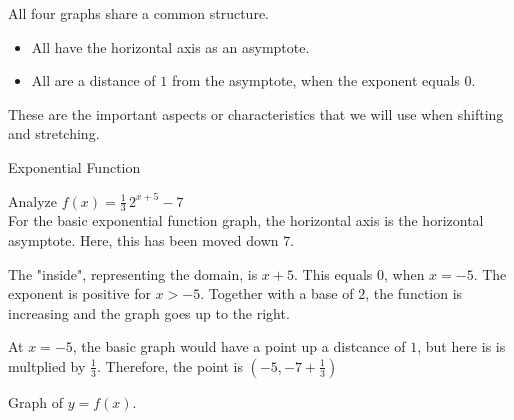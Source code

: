 \documentclass{ximera}
\begin{document}
All four graphs share a common structure.


\begin{itemize}
\item All have the horizontal axis as an asymptote.
\item All are a distance of $1$ from the asymptote, when the exponent equals $0$.
\end{itemize}

These are the important aspects or characteristics that we will use when shifting and stretching.






\begin{example}  Exponential Function



Analyze   $f(x) = \frac{1}{3} \, 2^{x+5} - 7$ \\


For the basic exponential function graph, the horizontal axis is the horizontal asymptote.  Here, this has been moved down $7$.



The "inside", representing the domain, is $x+5$.  This equals $0$, when $x=-5$.  The exponent is positive for $x>-5$. Together with a base of $2$, the function is increasing and the graph goes up to the right.

At $x=-5$, the basic graph would have a point up a distcance of $1$, but here is is multplied by $\frac{1}{3}$.  Therefore, the point is $\left(-5, -7 + \frac{1}{3}\right)$


Graph of $y = f(x)$.

\begin{image}
\end{image}
\end{example}
\end{document}
